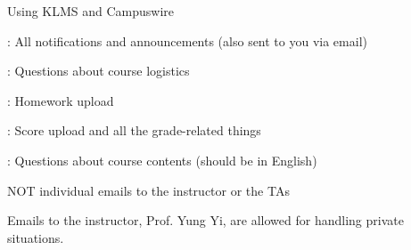 










\begin{frame}{Using KLMS and Campuswire}

  \plitemsep 0.1in
  \bci

\item<1-> : All notifications and announcements (also sent to
    you via email)


  \item<2-> : Questions about course logistics 


    \item<3-> : Homework upload
   \item<3-> : Score upload and all the grade-related things

        \bigskip
        
      \item<4-> : Questions about course contents (should be in English)



    \bigskip
  \item<5-> NOT individual emails to the instructor or the TAs

  \item<6-> Emails to the instructor, Prof. Yung Yi, are allowed for handling private situations.



    \eci

\end{frame}

